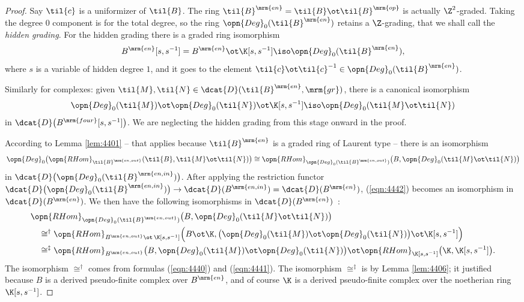 \begin{proof}
Say $\til{c}$ is a uniformizer of $\til{B}$. 
The ring $\til{B}^{\mrm{en}}  = \til{B} \ot \til{B}^{\mrm{op}}$ is actually
$\Z^2$-graded. Taking the degree $0$ component is for the total degree,
so the ring 
$\opn{Deg}_0(\til{B}^{\mrm{en}})$
retains a $\Z$-grading, that we shall call the {\em hidden grading}. For the 
hidden grading there is a graded ring isomorphism 
\begin{equation} \label{eqn:4440}
B^{\mrm{en}}[s, s^{-1}] = B^{\mrm{en}} \ot \K[s, s^{-1}] \iso 
\opn{Deg}_0(\til{B}^{\mrm{en}}) , 
\end{equation}
where $s$ is a variable of hidden degree $1$, and it goes to the element 
$\til{c} \ot \til{c}^{-1} \in \opn{Deg}_0(\til{B}^{\mrm{en}})$.

Similarly for complexes: given 
$\til{M}, \til{N} \in \dcat{D}(\til{B}^{\mrm{en}},  \mrm{gr})$,
there is a canonical isomorphism 
\begin{equation} \label{eqn:4441}
\opn{Deg}_0(\til{M}) \ot \opn{Deg}_0(\til{N}) \ot \K[s, s^{-1}] \iso 
\opn{Deg}_0(\til{M} \ot \til{N})
\end{equation}
in $\dcat{D} \bigl( B^{\mrm{four}}[s, s^{-1}] \bigr)$. 
We are neglecting the hidden grading from this stage onward in the proof. 

According to Lemma \ref{lem:4401} -- that applies because 
$\til{B}^{\mrm{en}}$ is a graded ring of Laurent type -- 
there is an isomorphism 
\begin{equation} \label{eqn:4442}
\opn{Deg}_0 \bigl( \opn{RHom}_{\til{B}^{\mrm{en, out}}}
(\til{B}, \til{M} \ot \til{N}) \bigr) \cong 
\opn{RHom}_{\opn{Deg}_0(\til{B}^{\mrm{en, out}})}
\bigl( B, \opn{Deg}_0(\til{M} \ot \til{N}) \bigr) 
\end{equation}
in $\dcat{D} \bigl( \opn{Deg}_0(\til{B}^{\mrm{en, in}}) \bigr)$.
After applying the restriction functor 
$\dcat{D} \bigl( \opn{Deg}_0(\til{B}^{\mrm{en, in}}) \bigr) \to 
\dcat{D}(B^{\mrm{en, in}}) =  \dcat{D}(B^{\mrm{en}})$,
(\ref{eqn:4442}) becomes an isomorphism in $\dcat{D}(B^{\mrm{en}})$. 
We then have the following isomorphisms in $\dcat{D}(B^{\mrm{en}})$~: 
\begin{equation} \label{eqn:4443}
\begin{aligned}
& 
\opn{RHom}_{\opn{Deg}_0(\til{B}^{\mrm{en, out}})}
\bigl( B, \opn{Deg}_0(\til{M} \ot \til{N}) \bigr)
\\ & \quad 
\cong^{\dag} \opn{RHom}_{B^{\mrm{en, out}} \ot \, \K[s, s^{-1}]}
\Bigl( B \ot \K, 
\bigl( \opn{Deg}_0(\til{M}) \ot \opn{Deg}_0(\til{N}) \bigr) \ot \K[s, s^{-1}] 
\Bigr)
\\ & \quad 
\cong^{\ddag} \opn{RHom}_{B^{\mrm{en, out}}} \bigl( B, 
\opn{Deg}_0(\til{M}) \ot \opn{Deg}_0(\til{N}) \bigr) \ot 
\opn{RHom}_{\K[s, s^{-1}]} \bigl( \K, \K[s, s^{-1}] \bigr) . 
\end{aligned}
\end{equation}
The isomorphism $\cong^{\dag}$ comes from formulas 
(\ref{eqn:4440}) and (\ref{eqn:4441}).
The isomorphism $\cong^{\ddag}$ is by Lemma \ref{lem:4406}; it 
justified because $B$ is a derived pseudo-finite complex over $B^{\mrm{en}}$, 
and of course $\K$ is a derived pseudo-finite complex over the noetherian ring 
$\K[s, s^{-1}]$.


\end{proof}
